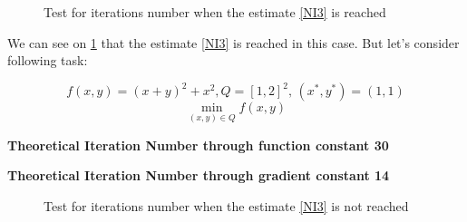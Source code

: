 \documentclass[12pt]{article}
\begin{document}
\begin{figure}[h!]
\label{fig:image2}
 \caption{Test for iterations number when the estimate \ref{NI3} is reached}
\end{figure}

We can see on \ref{fig:image2} that the estimate \ref{NI3} is reached in this case. But let's consider following task:

$$f(x,y) = (x+y)^2+x^2, Q = [1,2]^2,\,(x^*, y^*) = (1,1)$$
$$\min\limits_{(x,y)\in Q}f(x,y)$$

\textbf{Theoretical Iteration Number through function constant 30}

\textbf{Theoretical Iteration Number through gradient constant 14}

\begin{figure}[h!]
\label{fig:image1}
 \caption{Test for iterations number when the estimate \ref{NI3} is not reached}
\end{figure}
\end{document}
